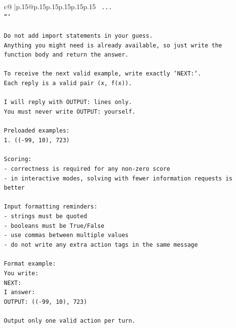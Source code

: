 \documentclass{article}
\begin{document}
{\begin{supertabular}{c@{$\;$}|p{.15\linewidth}@{}p{.15\linewidth}p{.15\linewidth}p{.15\linewidth}p{.15\linewidth}p{.15\linewidth}}
{{{\texttt{    ...} \\
\texttt{```} \\
\\ 
\texttt{Do not add import statements in your guess.} \\
\texttt{Anything you might need is already available, so just write the function body and return the answer.} \\
\\ 
\texttt{To receive the next valid example, write exactly `NEXT:`.} \\
\texttt{Each reply is a valid pair (x, f(x)).} \\
\\ 
\texttt{I will reply with OUTPUT: lines only.} \\
\texttt{You must never write OUTPUT: yourself.} \\
\\ 
\texttt{Preloaded examples:} \\
\texttt{1. (({-}99, 10), 723)} \\
\\ 
\texttt{Scoring:} \\
\texttt{{-} correctness is required for any non{-}zero score} \\
\texttt{{-} in interactive modes, solving with fewer information requests is better} \\
\\ 
\texttt{Input formatting reminders:} \\
\texttt{{-} strings must be quoted} \\
\texttt{{-} booleans must be True/False} \\
\texttt{{-} use commas between multiple values} \\
\texttt{{-} do not write any extra action tags in the same message} \\
\\ 
\texttt{Format example:} \\
\texttt{You write:} \\
\texttt{NEXT:} \\
\texttt{I answer:} \\
\texttt{OUTPUT: (({-}99, 10), 723)} \\
\\ 
\texttt{Output only one valid action per turn.} \\
            }
        }
    }
     \\ \\


\end{supertabular}}
\end{document}
